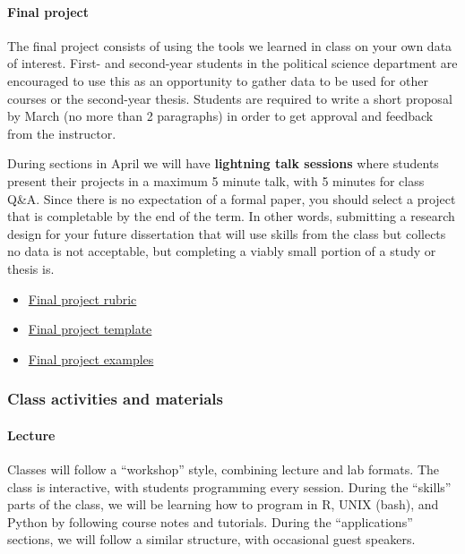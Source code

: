 \documentclass[
]{article}
\begin{document}
\hypertarget{final-project}{%
\paragraph{Final project}\label{final-project}}

The final project consists of using the tools we learned in class on
your own data of interest. First- and second-year students in the
political science department are encouraged to use this as an
opportunity to gather data to be used for other courses or the
second-year thesis. Students are required to write a short proposal by
March (no more than 2 paragraphs) in order to get approval and feedback
from the instructor.

During sections in April we will have \textbf{lightning talk sessions}
where students present their projects in a maximum 5 minute talk, with 5
minutes for class Q\&A. Since there is no expectation of a formal paper,
you should select a project that is completable by the end of the term.
In other words, submitting a research design for your future
dissertation that will use skills from the class but collects no data is
not acceptable, but completing a viably small portion of a study or
thesis is.

\begin{itemize}
\item
  \href{https://github.com/jaeyk/PS239T/blob/master/final_projects/rubric.md}{Final
  project rubric}
\item
  \href{https://github.com/jaeyk/PS239T/tree/master/final_projects/template}{Final
  project template}
\item
  \href{https://github.com/jaeyk/PS239T/blob/master/final_projects/template/past_projects.md}{Final
  project examples}
\end{itemize}

\hypertarget{class-activities-and-materials}{%
\subsubsection{Class activities and
materials}\label{class-activities-and-materials}}

\hypertarget{lecture}{%
\paragraph{Lecture}\label{lecture}}

Classes will follow a ``workshop'' style, combining lecture and lab
formats. The class is interactive, with students programming every
session. During the ``skills'' parts of the class, we will be learning
how to program in R, UNIX (bash), and Python by following course notes
and tutorials. During the ``applications'' sections, we will follow a
similar structure, with occasional guest speakers.
\end{document}
